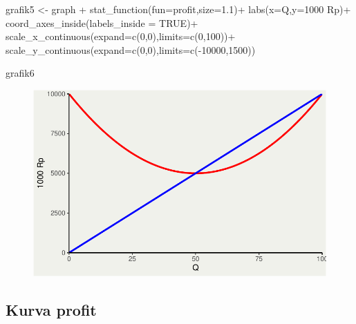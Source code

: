 \documentclass[
  letterpaper,
  DIV=11,
  numbers=noendperiod]{scrartcl}
\newenvironment{Shaded}{\begin{snugshade}}{\end{snugshade}}
\newcommand{\AttributeTok}[1]{\textcolor[rgb]{0.40,0.45,0.13}{#1}}
\newcommand{\ConstantTok}[1]{\textcolor[rgb]{0.56,0.35,0.01}{#1}}
\newcommand{\DecValTok}[1]{\textcolor[rgb]{0.68,0.00,0.00}{#1}}
\newcommand{\FloatTok}[1]{\textcolor[rgb]{0.68,0.00,0.00}{#1}}
\newcommand{\FunctionTok}[1]{\textcolor[rgb]{0.28,0.35,0.67}{#1}}
\newcommand{\NormalTok}[1]{\textcolor[rgb]{0.00,0.23,0.31}{#1}}
\newcommand{\OtherTok}[1]{\textcolor[rgb]{0.00,0.23,0.31}{#1}}
\newcommand{\SpecialCharTok}[1]{\textcolor[rgb]{0.37,0.37,0.37}{#1}}
\newcommand{\StringTok}[1]{\textcolor[rgb]{0.13,0.47,0.30}{#1}}
\begin{document}
\begin{Shaded}
\begin{Highlighting}[]
\NormalTok{grafik5 }\OtherTok{\textless{}{-}}\NormalTok{ graph }\SpecialCharTok{+}
  \FunctionTok{stat\_function}\NormalTok{(}\AttributeTok{fun=}\NormalTok{profit,}\AttributeTok{size=}\FloatTok{1.1}\NormalTok{)}\SpecialCharTok{+}
  \FunctionTok{labs}\NormalTok{(}\AttributeTok{x=}\StringTok{\textquotesingle{}Q\textquotesingle{}}\NormalTok{,}\AttributeTok{y=}\StringTok{\textquotesingle{}1000 Rp\textquotesingle{}}\NormalTok{)}\SpecialCharTok{+}
  \FunctionTok{coord\_axes\_inside}\NormalTok{(}\AttributeTok{labels\_inside =} \ConstantTok{TRUE}\NormalTok{)}\SpecialCharTok{+}
  \FunctionTok{scale\_x\_continuous}\NormalTok{(}\AttributeTok{expand=}\FunctionTok{c}\NormalTok{(}\DecValTok{0}\NormalTok{,}\DecValTok{0}\NormalTok{),}\AttributeTok{limits=}\FunctionTok{c}\NormalTok{(}\DecValTok{0}\NormalTok{,}\DecValTok{100}\NormalTok{))}\SpecialCharTok{+}
  \FunctionTok{scale\_y\_continuous}\NormalTok{(}\AttributeTok{expand=}\FunctionTok{c}\NormalTok{(}\DecValTok{0}\NormalTok{,}\DecValTok{0}\NormalTok{),}\AttributeTok{limits=}\FunctionTok{c}\NormalTok{(}\SpecialCharTok{{-}}\DecValTok{10000}\NormalTok{,}\DecValTok{1500}\NormalTok{))}

\NormalTok{grafik6}
\end{Highlighting}
\end{Shaded}

\begin{figure}[H]

{\centering \includegraphics{index_files/figure-pdf/unnamed-chunk-9-1.pdf}

}

\end{figure}

\hypertarget{kurva-profit}{%
\subsection{Kurva profit}\label{kurva-profit}}
\end{document}
